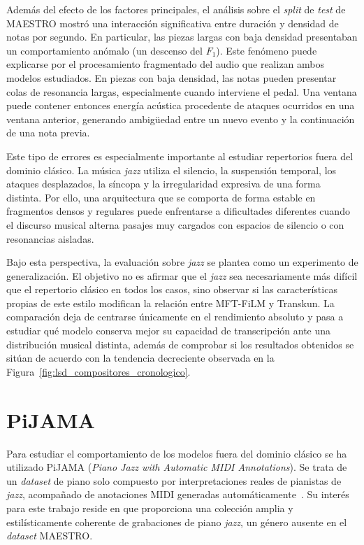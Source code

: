 \documentclass[11pt,spanish,listoffigures,listoftables]{tfgetsinf}
\begin{document}
Además del efecto de los factores principales, el análisis sobre el \textit{split} de \textit{test} de MAESTRO mostró una
interacción significativa entre duración y densidad de notas por segundo. En particular,
las piezas largas con baja densidad presentaban un comportamiento anómalo (un descenso del $F_1$). Este
fenómeno puede explicarse por el procesamiento fragmentado del audio que realizan ambos modelos estudiados. En
piezas con baja densidad, las notas pueden presentar colas de resonancia largas,
especialmente cuando interviene el pedal. Una ventana puede contener entonces energía
acústica procedente de ataques ocurridos en una ventana anterior, generando ambigüedad
entre un nuevo evento y la continuación de una nota previa.

Este tipo de errores es especialmente importante al estudiar repertorios fuera del dominio
clásico. La música \textit{jazz} utiliza el silencio, la suspensión temporal, los ataques desplazados,
la síncopa y la irregularidad expresiva de una forma distinta. Por ello, una arquitectura
que se comporta de forma estable en fragmentos densos y regulares puede enfrentarse
a dificultades diferentes cuando el discurso musical alterna pasajes muy cargados con
espacios de silencio o con resonancias aisladas.


Bajo esta perspectiva, la evaluación sobre \textit{jazz} se plantea como un experimento de
generalización. El objetivo no es afirmar que el \textit{jazz} sea necesariamente más difícil que
el repertorio clásico en todos los casos, sino observar si las características propias de
este estilo modifican la relación entre MFT-FiLM y Transkun. La comparación deja de
centrarse únicamente en el rendimiento absoluto y pasa a estudiar qué modelo conserva
mejor su capacidad de transcripción ante una distribución musical distinta, además de comprobar si los resultados obtenidos se sitúan
de acuerdo con la tendencia decreciente observada en la Figura~\ref{fig:lsd_compositores_cronologico}.


\section{PiJAMA}
\label{sec:pijama_dataset_jazz}

Para estudiar el comportamiento de los modelos fuera del dominio clásico se ha utilizado
PiJAMA (\textit{Piano Jazz with Automatic MIDI Annotations}). Se trata de
un \textit{dataset} de piano solo compuesto por interpretaciones reales de
pianistas de \textit{jazz}, acompañado de anotaciones MIDI generadas automáticamente~\cite{edwards2023pijama}. Su interés para este trabajo reside en que proporciona una
colección amplia y estilísticamente coherente de grabaciones de piano \textit{jazz}, un género
ausente en el \textit{dataset} MAESTRO.
\end{document}
